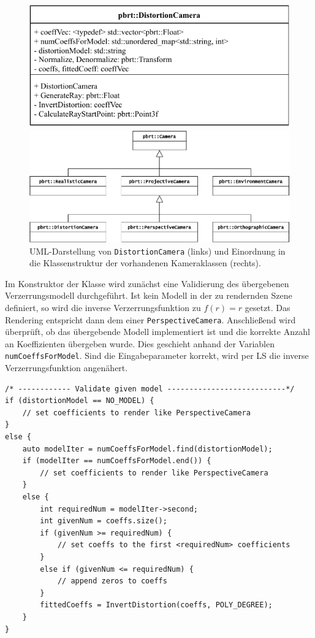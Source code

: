 \begin{figure}[h]
	\begin{minipage}{.5\textwidth}
		\centering
		\includegraphics[height=.4\columnwidth]{uml_distortioncam}
	\end{minipage}
	\begin{minipage}{.5\textwidth}
		\centering
		\includegraphics[height=.4\columnwidth]{uml_classes}
	\end{minipage}
	\caption{UML-Darstellung von \texttt{DistortionCamera} (links) und Einordnung in die Klassenstruktur der vorhandenen Kameraklassen (rechts).}
	\label{fig:uml}
\end{figure}

Im Konstruktor der Klasse wird zunächst eine Validierung des übergebenen Verzerrungsmodell durchgeführt. Ist kein Modell in der zu rendernden Szene definiert, so wird die inverse Verzerrungsfunktion zu $f(r) = r$ gesetzt. Das Rendering entspricht dann dem einer \texttt{PerspectiveCamera}. Anschließend wird überprüft, ob das übergebende Modell implementiert ist und die korrekte Anzahl an Koeffizienten übergeben wurde. Dies geschieht anhand der Variablen \texttt{numCoeffsForModel}. Sind die Eingabeparameter korrekt, wird per LS die inverse Verzerrungsfunktion angenähert.
\begin{lstlisting}[caption={Validierung der übergebenen Modellparameter}]
/* ------------ Validate given model ---------------------------*/
if (distortionModel == NO_MODEL) {
	// set coefficients to render like PerspectiveCamera	
}
else {
	auto modelIter = numCoeffsForModel.find(distortionModel);
	if (modelIter == numCoeffsForModel.end()) {
		// set coefficients to render like PerspectiveCamera
	}
	else {
		int requiredNum = modelIter->second;
		int givenNum = coeffs.size();
		if (givenNum >= requiredNum) {
			// set coeffs to the first <requiredNum> coefficients
		}
		else if (givenNum <= requiredNum) {
			// append zeros to coeffs
		}
		fittedCoeffs = InvertDistortion(coeffs, POLY_DEGREE);
	}
}
\end{lstlisting}

